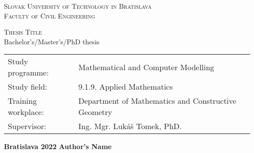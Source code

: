 \begin{center}
	\textsc{\LARGE
		Slovak University of Technology in Bratislava\\
		\vspace{10pt}
		Faculty of Civil Engineering}\\
	
	\vfill
	
	\textsc{\LARGE
		Thesis Title}\\ 
		\vspace{10pt}
	{\Large
		Bachelor's/Master's/PhD thesis}
\end{center}

\vfill

\noindent
\begin{tabular}{ll}
    Study programme: & Mathematical and Computer Modelling\\
	Study field: & 9.1.9. Applied Mathematics\\
	Training workplace:& Department of Mathematics and Constructive Geometry\\
	Supervisor: & Ing. Mgr. Lukáš Tomek, PhD. \\
\end{tabular}

\vspace{0.1\textheight}

{\Large
	\noindent \textbf{Bratislava 2022}
	\hfill \textbf{Author's Name} %
}

\

